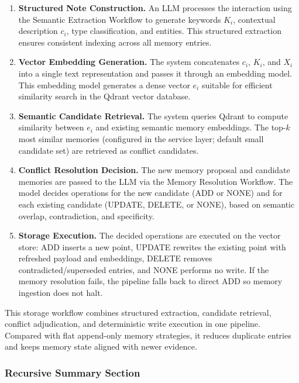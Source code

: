 \documentclass[12pt,a4paper]{article}
\begin{document}
\begin{enumerate}
    \item \textbf{Structured Note Construction.} An LLM processes the interaction using the Semantic Extraction Workflow to generate keywords $K_i$, contextual description $c_i$, type classification, and entities. This structured extraction ensures consistent indexing across all memory entries.
    
    \item \textbf{Vector Embedding Generation.} The system concatenates $c_i$, $K_i$, and $X_i$ into a single text representation and passes it through an embedding model. This embedding model generates a dense vector $e_i$ suitable for efficient similarity search in the Qdrant vector database.
    
    \item \textbf{Semantic Candidate Retrieval.} The system queries Qdrant to compute similarity between $e_i$ and existing semantic memory embeddings. The top-$k$ most similar memories (configured in the service layer; default small candidate set) are retrieved as conflict candidates.
    
    \item \textbf{Conflict Resolution Decision.} The new memory proposal and candidate memories are passed to the LLM via the Memory Resolution Workflow. The model decides operations for the new candidate (ADD or NONE) and for each existing candidate (UPDATE, DELETE, or NONE), based on semantic overlap, contradiction, and specificity.
    
    \item \textbf{Storage Execution.} The decided operations are executed on the vector store: ADD inserts a new point, UPDATE rewrites the existing point with refreshed payload and embeddings, DELETE removes contradicted/superseded entries, and NONE performs no write. If the memory resolution fails, the pipeline falls back to direct ADD so memory ingestion does not halt.
\end{enumerate}

This storage workflow combines structured extraction, candidate retrieval, conflict adjudication, and deterministic write execution in one pipeline. Compared with flat append-only memory strategies, it reduces duplicate entries and keeps memory state aligned with newer evidence.

\subsubsection{Recursive Summary Section}
\end{document}
